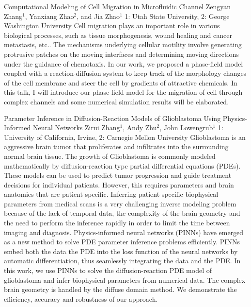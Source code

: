 \begin{addmargin}[2em]{0em}
\vspace{1.5ex}
\abs
{Computational Modeling of Cell Migration in Microfluidic Channel}
{Zengyan Zhang$^{1}$, Yanxiang Zhao$^{2}$, and Jia Zhao$^{1}$}
{1: Utah State University, 2: George Washington University}
{Cell migration plays an important role in various biological processes, such as tissue morphogenesis, wound healing and cancer metastasis, etc.. The mechanisms underlying cellular motility involve generating protrusive patches on the moving interfaces and determining moving directions under the guidance of chemotaxis. In our work, we proposed a phase-field model coupled with a reaction-diffusion system to keep track of the morphology changes of the cell membrane and steer the cell by gradients of attractive chemicals. In this talk, I will introduce our phase-field model for the migration of cell through complex channels and some numerical simulation results will be elaborated.}


\vspace{1.5ex}
\abs
{Parameter Inference in Diffusion-Reaction Models of Glioblastoma Using Physics-Informed Neural Networks}
{Zirui Zhang$^{1}$, Andy Zhu$^{2}$, John Lowengrub$^{1}$}
{1: University of California, Irvine, 2: Carnegie Mellon University}
{Glioblastoma is an aggressive brain tumor that proliferates and infiltrates into the surrounding normal brain tissue. The growth of Glioblastoma is commonly modeled mathematically by diffusion-reaction type partial differential equations (PDEs). These models can be used to predict tumor progression and guide treatment decisions for individual patients. However, this requires parameters and brain anatomies that are patient specific. Inferring patient specific biophysical parameters from medical scans is a very challenging inverse modeling problem because of the lack of temporal data, the complexity of the brain geometry and the need to perform the inference rapidly in order to limit the time between imaging and diagnosis. Physics-informed neural networks (PINNs) have emerged as a new method to solve PDE parameter inference problems efficiently. PINNs embed both the data the PDE into the loss function of the neural networks by automatic differentiation, thus seamlessly integrating the data and the PDE. In this work, we use PINNs to solve the diffusion-reaction PDE model of glioblastoma and infer biophysical parameters from numerical data. The complex brain geometry is handled by the diffuse domain method. We demonstrate the efficiency, accuracy and robustness of our approach.}
\end{addmargin}

